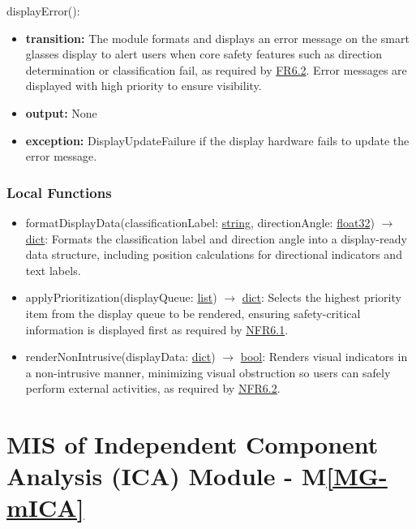 \documentclass[12pt, titlepage]{article}
\newcommand{\mref}[1]{M\ref{#1}}
\begin{document}
\noindent displayError():
\begin{itemize}
\item \textbf{transition:} The module formats and displays an error message on
  the smart glasses display to alert users when core safety features such as
  direction determination or classification fail, as required by
  \hyperref[SRS-FR6_2]{FR6.2}. Error messages are displayed with high priority
  to ensure visibility.

\item \textbf{output:} None

\item \textbf{exception:} DisplayUpdateFailure if the display hardware fails to
  update the error message.
\end{itemize}

\subsubsection{Local Functions}

\begin{itemize}
  \item formatDisplayData(classificationLabel:
    \hyperref[generic:string]{string}, directionAngle:
    \hyperref[generic:float32]{float32}) $\rightarrow$ \hyperref[ds:dict]{dict}:
    Formats the classification label and direction angle into a display-ready
    data structure, including position calculations for directional indicators
    and text labels.
  \item applyPrioritization(displayQueue: \hyperref[ds:list]{list})
    $\rightarrow$ \hyperref[ds:dict]{dict}: Selects the highest priority item
    from the display queue to be rendered, ensuring safety-critical information
    is displayed first as required by \hyperref[SRS-NFR6_1]{NFR6.1}.
  \item renderNonIntrusive(displayData: \hyperref[ds:dict]{dict}) $\rightarrow$
    \hyperref[generic:bool]{bool}: Renders visual indicators in a non-intrusive
    manner, minimizing visual obstruction so users can safely perform external
    activities, as required by \hyperref[SRS-NFR6_2]{NFR6.2}.
\end{itemize}

\newpage 

\section{MIS of Independent Component Analysis (ICA) Module \label{mod:ICA} -
\mref{MG-mICA}}
\end{document}
